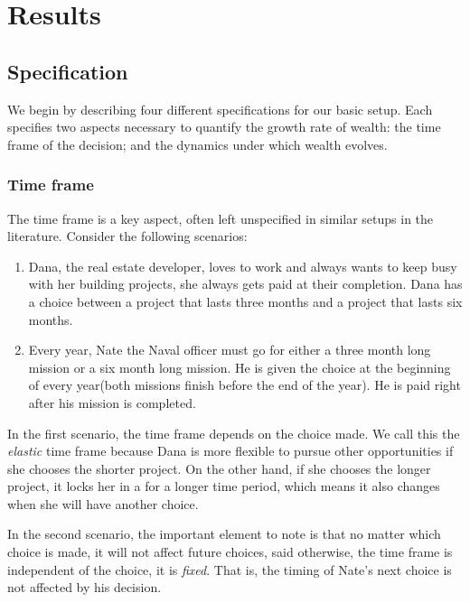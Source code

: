 \documentclass[11pt]{article}
\numberwithin{equation}{section}
\begin{document}
\section{Results}\label{sec:results}

\subsection{Specification}

We begin by describing four different specifications for our basic setup. Each specifies two aspects necessary to quantify the growth rate of wealth: the time frame of the decision; and the dynamics under which wealth evolves.

\subsubsection{Time frame}

The time frame is a key aspect, often left unspecified in similar setups in the literature. Consider the following scenarios:

\begin{enumerate}
    \item Dana, the real estate developer, loves to work and always wants to keep busy with her building projects, she always gets paid at their completion. Dana has a choice between a project that lasts three months and a project that lasts six months. 
    \item Every year, Nate the Naval officer must go for either a three month long mission or a six month long mission. He is given the choice at the beginning of every year(both missions finish before the end of the year). He is paid right after his mission is completed.
\end{enumerate}

In the first scenario, the time frame depends on the choice made. We call this the \textit{elastic} time frame because Dana is more flexible to pursue other opportunities if she chooses the shorter project. On the other hand, if she chooses the longer project, it locks her in a for a longer time period, which means it also changes when she will have another choice.  

In the second scenario, the important element to note is that no matter which choice is made, it will not affect future choices, said otherwise, the time frame is independent of the choice, it is \textit{fixed}. That is, the timing of Nate's next choice is not affected by his decision. 
\end{document}
